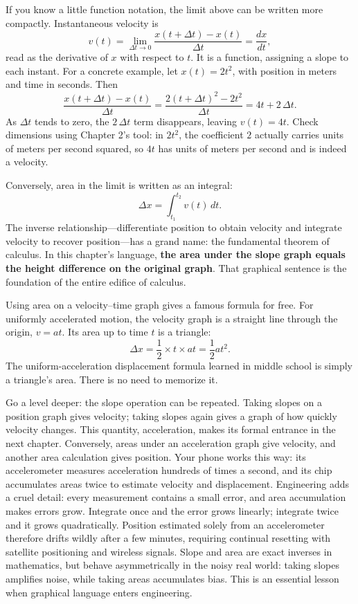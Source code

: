 \begin{mathbridge}
If you know a little function notation, the limit above can be written more compactly. Instantaneous velocity is
\[
v(t)=\lim_{\Delta t\to 0}\frac{x(t+\Delta t)-x(t)}{\Delta t}=\frac{dx}{dt},
\]
read as the derivative of \(x\) with respect to \(t\). It is a function, assigning a slope to each instant. For a concrete example, let \(x(t)=2t^{2}\), with position in meters and time in seconds. Then
\[
\frac{x(t+\Delta t)-x(t)}{\Delta t}=\frac{2(t+\Delta t)^{2}-2t^{2}}{\Delta t}=4t+2\,\Delta t.
\]
As \(\Delta t\) tends to zero, the \(2\,\Delta t\) term disappears, leaving \(v(t)=4t\). Check dimensions using Chapter 2's tool: in \(2t^{2}\), the coefficient \(2\) actually carries units of meters per second squared, so \(4t\) has units of meters per second and is indeed a velocity.

Conversely, area in the limit is written as an integral:
\[
\Delta x=\int_{t_1}^{t_2} v(t)\,dt.
\]
The inverse relationship---differentiate position to obtain velocity and integrate velocity to recover position---has a grand name: the fundamental theorem of calculus. In this chapter's language, \textbf{the area under the slope graph equals the height difference on the original graph}. That graphical sentence is the foundation of the entire edifice of calculus.
\end{mathbridge}

\begin{challenge}
Using area on a velocity--time graph gives a famous formula for free. For uniformly accelerated motion, the velocity graph is a straight line through the origin, \(v=at\). Its area up to time \(t\) is a triangle:
\[
\Delta x=\frac{1}{2}\times t\times at=\frac{1}{2}at^{2}.
\]
The uniform-acceleration displacement formula learned in middle school is simply a triangle's area. There is no need to memorize it.

Go a level deeper: the slope operation can be repeated. Taking slopes on a position graph gives velocity; taking slopes again gives a graph of how quickly velocity changes. This quantity, acceleration, makes its formal entrance in the next chapter. Conversely, areas under an acceleration graph give velocity, and another area calculation gives position. Your phone works this way: its accelerometer measures acceleration hundreds of times a second, and its chip accumulates areas twice to estimate velocity and displacement. Engineering adds a cruel detail: every measurement contains a small error, and area accumulation makes errors grow. Integrate once and the error grows linearly; integrate twice and it grows quadratically. Position estimated solely from an accelerometer therefore drifts wildly after a few minutes, requiring continual resetting with satellite positioning and wireless signals. Slope and area are exact inverses in mathematics, but behave asymmetrically in the noisy real world: taking slopes amplifies noise, while taking areas accumulates bias. This is an essential lesson when graphical language enters engineering.
\end{challenge}

